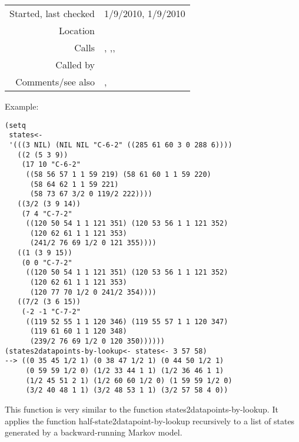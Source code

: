 \vspace{0.3cm}
\begin{tabular}{r|p{8cm}}
Started, last checked & 1/9/2010, 1/9/2010 \\
Location & \nameref{sec:realising-states-backwards} \\
Calls & \nameref{fun:create-MIDI-and-morphetic-numbers<-}, \nameref{fun:fibonacci-list},\newline \nameref{fun:half-state2datapoints-by-lookup},\newline \nameref{fun:state-durations-by-beat} \\
Called by & \\
Comments/see also & \nameref{fun:states2datapoints},\newline \nameref{fun:states2datapoints-by-lookup}
\end{tabular}

\vspace{0.5cm}
\noindent Example:
\begin{verbatim}
(setq 
 states<-
 '(((3 NIL) (NIL NIL "C-6-2" ((285 61 60 3 0 288 6))))
   ((2 (5 3 9))
    (17 10 "C-6-2"
     ((58 56 57 1 1 59 219) (58 61 60 1 1 59 220)
      (58 64 62 1 1 59 221)
      (58 73 67 3/2 0 119/2 222))))
   ((3/2 (3 9 14))
    (7 4 "C-7-2"
     ((120 50 54 1 1 121 351) (120 53 56 1 1 121 352)
      (120 62 61 1 1 121 353)
      (241/2 76 69 1/2 0 121 355))))
   ((1 (3 9 15))
    (0 0 "C-7-2"
     ((120 50 54 1 1 121 351) (120 53 56 1 1 121 352)
      (120 62 61 1 1 121 353)
      (120 77 70 1/2 0 241/2 354))))
   ((7/2 (3 6 15))
    (-2 -1 "C-7-2"
     ((119 52 55 1 1 120 346) (119 55 57 1 1 120 347)
      (119 61 60 1 1 120 348)
      (239/2 76 69 1/2 0 120 350))))))
(states2datapoints-by-lookup<- states<- 3 57 58)
--> ((0 35 45 1/2 1) (0 38 47 1/2 1) (0 44 50 1/2 1)
     (0 59 59 1/2 0) (1/2 33 44 1 1) (1/2 36 46 1 1)
     (1/2 45 51 2 1) (1/2 60 60 1/2 0) (1 59 59 1/2 0)
     (3/2 40 48 1 1) (3/2 48 53 1 1) (3/2 57 58 4 0))
\end{verbatim}

\noindent This function is very similar to the
function states2datapoints-by-lookup. It applies the
function half-state2datapoint-by-lookup recursively to
a list of states generated by a backward-running
Markov model.
















